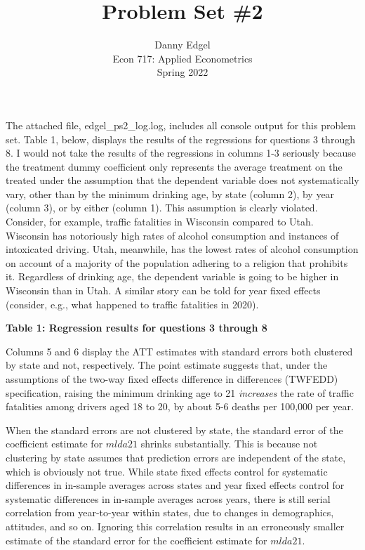 \documentclass{article}
\begin{document}
\title{	Problem Set \#2 }
\author{ 	Danny Edgel 			\\ 
		Econ 717: Applied Econometrics	\\
		Spring 2022						
		}
\maketitle\thispagestyle{empty}


\noindent The attached file, edgel\_ps2\_log.log, includes all console output for this problem set. Table 1, below, displays the results of the regressions for questions 3 through 8. I would not take the results of the regressions in columns 1-3 seriously because the treatment dummy coefficient only represents the average treatment on the treated under the assumption that the dependent variable does not systematically vary, other than by the minimum drinking age, by state (column 2), by year (column 3), or by either (column 1). This assumption is clearly violated. Consider, for example, traffic fatalities in Wisconsin compared to Utah. Wisconsin has notoriously high rates of alcohol consumption and instances of intoxicated driving. Utah, meanwhile, has the lowest rates of alcohol consumption on account of a majority of the population adhering to a religion that prohibits it. Regardless of drinking age, the dependent variable is going to be higher in Wisconsin than in Utah. A similar story can be told for year fixed effects (consider, e.g., what happened to traffic fatalities in 2020).
\begin{center}
        \textbf{Table 1: Regression results for questions 3 through 8}
        {\small}
\end{center}
\noindent Columns 5 and 6 display the ATT estimates with standard errors both clustered by state and not, respectively. The point estimate suggests that, under the assumptions of the two-way fixed effects difference in differences (TWFEDD) specification, raising the minimum drinking age to 21 \textit{increases} the rate of traffic fatalities among drivers aged 18 to 20, by about 5-6 deaths per 100,000 per year. 

When the standard errors are not clustered by state, the standard error of the coefficient estimate for $mlda21$ shrinks substantially. This is because not clustering by state assumes that prediction errors are independent of the state, which is obviously not true. While state fixed effects control for systematic differences in in-sample averages across states and year fixed effects control for systematic differences in in-sample averages across years, there is still serial correlation from year-to-year within states, due to changes in demographics, attitudes, and so on. Ignoring this correlation results in an erroneously smaller estimate of the standard error for the coefficient estimate for $mlda21$. 
\end{document}
